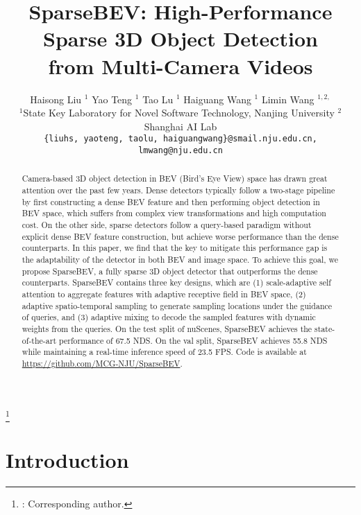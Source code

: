 \documentclass[10pt,twocolumn,letterpaper]{article}
\newcommand\blfootnote[1]{\begingroup
  \renewcommand\thefootnote{}\footnote{#1}\addtocounter{footnote}{-1}\endgroup
}
\begin{document}
\title{SparseBEV: High-Performance Sparse 3D Object Detection \\ from Multi-Camera Videos}

\author{
Haisong Liu $^{1}$ \quad Yao Teng $^{1}$ \quad Tao Lu $^{1}$ \quad Haiguang Wang $^{1}$ \quad Limin Wang $^{1,2,}$ \textsuperscript{\Letter} \\
$^{1}$State Key Laboratory for Novel Software Technology, Nanjing University \quad $^{2}$Shanghai AI Lab \\
\small\texttt{\{liuhs, yaoteng, taolu, haiguangwang\}@smail.nju.edu.cn, lmwang@nju.edu.cn}
}

\maketitle


\begin{abstract}
  Camera-based 3D object detection in BEV (Bird's Eye View) space has drawn great attention over the past few years.
  Dense detectors typically follow a two-stage pipeline by first constructing a dense BEV feature and then performing object detection in BEV space, which suffers from complex view transformations and high computation cost.
  On the other side, sparse detectors follow a query-based paradigm without explicit dense BEV feature construction, but achieve worse performance than the dense counterparts.
  In this paper, we find that the key to mitigate this performance gap is the adaptability of the detector in both BEV and image space.
  To achieve this goal, we propose SparseBEV, a fully sparse 3D object detector that outperforms the dense counterparts.
  SparseBEV contains three key designs, which are (1) scale-adaptive self attention to aggregate features with adaptive receptive field in BEV space, (2) adaptive spatio-temporal sampling to generate sampling locations under the guidance of queries, and (3) adaptive mixing to decode the sampled features with dynamic weights from the queries.
  On the test split of nuScenes, SparseBEV achieves the state-of-the-art performance of 67.5 NDS. On the val split, SparseBEV achieves 55.8 NDS while maintaining a real-time inference speed of 23.5 FPS.
  Code is available at \url{https://github.com/MCG-NJU/SparseBEV}.
\end{abstract}
\blfootnote{\Letter: Corresponding author.}

\section{Introduction}
\end{document}
